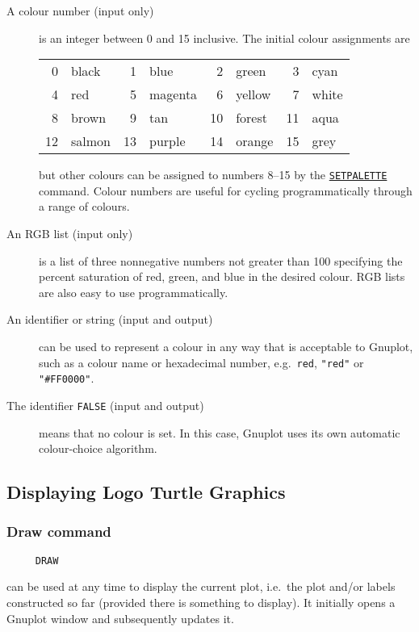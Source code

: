 \begin{description}
\item[A colour number (input only)] is an integer between 0 and 15
  inclusive.  The initial colour assignments are
  \begin{center}
    \begin{tabular}{rlrlrlrl}
       0 & black  &  1 & blue    &  2 & green  &  3 & cyan  \\
       4 & red    &  5 & magenta &  6 & yellow &  7 & white \\
       8 & brown  &  9 & tan     & 10 & forest & 11 & aqua  \\
      12 & salmon & 13 & purple  & 14 & orange & 15 & grey
    \end{tabular}
  \end{center}
  but other colours can be assigned to numbers 8--15 by the
  \hyperref[logoturtle:setpalette]{\texttt{SETPALETTE}} command.
  Colour numbers are useful for cycling programmatically through a
  range of colours.

\item[An RGB list (input only)] is a list of three nonnegative numbers
  not greater than 100 specifying the percent saturation of red,
  green, and blue in the desired colour.  RGB lists are also easy to
  use programmatically.

\item[An identifier or string (input and output)] can be used to
  represent a colour in any way that is acceptable to Gnuplot, such as
  a colour name or hexadecimal number, e.g.\ \texttt{red},
  \texttt{"red"} or \texttt{"\#FF0000"}.

\item[The identifier \texttt{FALSE} (input and output)] means that no
  colour is set.  In this case, Gnuplot uses its own automatic
  colour-choice algorithm.
\end{description}


\subsection{Displaying Logo Turtle Graphics}

\subsubsection*{Draw command}
\begin{verbatim}
     DRAW
\end{verbatim}
\label{logoturtle:draw}
can be used at any time to display the current plot, i.e.\ the plot
and/or labels constructed so far (provided there is something to
display).  It initially opens a Gnuplot window and subsequently
updates it.

